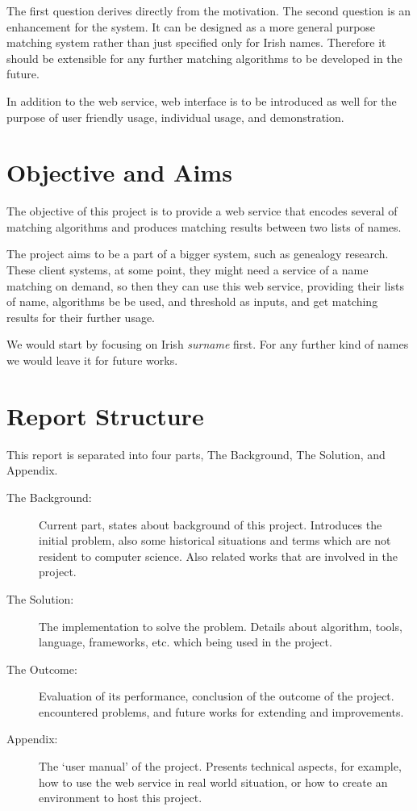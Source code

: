 The first question derives directly from the motivation.
The second question is an enhancement for the system. It can be designed
as a more general purpose matching system rather than just specified
only for Irish names. Therefore it should be extensible for any further
matching algorithms to be developed in the future.

In addition to the web service, web interface is to be introduced as well
for the purpose of user friendly usage, individual usage, and demonstration.

\section{Objective and Aims}
\label{sec:obj}

The objective of this project is to provide a web service that
encodes several of matching algorithms and produces matching
results between two lists of names.

The project aims to be a part of a bigger system, such as
genealogy research. These client systems, at some point,
they might need a service of a name matching on demand, so then they can use this
web service, providing their lists of name, algorithms be be used,
and threshold as inputs, and get matching results for their further usage.

We would start by focusing on Irish \textit{surname} first.
For any further kind of names we would leave it for future works.

\section{Report Structure}

This report is separated into four parts, The Background, The Solution,
and Appendix.

\begin{description}
\item[The Background:]
  Current part, states about background of this project. Introduces
  the initial problem, also some historical situations and terms
  which are not resident to computer science. Also related works
  that are involved in the project.
\item[The Solution:]
  The implementation to solve the problem. Details about algorithm,
  tools, language, frameworks, etc. which being used in the project.
\item[The Outcome:]
  Evaluation of its performance, conclusion of the outcome of the project.
  encountered problems, and future works for extending and improvements.
\item[Appendix:]
  The `user manual' of the project. Presents technical aspects,
  for example, how to use the web service in real world situation,
  or how to create an environment to host this project.
\end{description}

